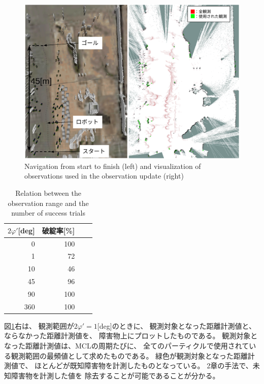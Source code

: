 \documentclass{jarticle}
\begin{document}
\begin{figure}[t]
  \centering
   \includegraphics[width=0.8\linewidth]{fig/particle_1000_observation_1_mcl.png}
   \caption{Navigation from start to finish (left) and visualization of observations used in the observation update (right)}
   \label{fig:スタートからゴールまでナビゲーション}
\end{figure}

\begin{table}[htbp]
	\centering
	\caption{Relation between the observation range and the number of success trials}
  \label{table:破綻率}
	\begin{small}
  \begin{tabular}{|r|r|r|r|} \hline
	  $2\varphi'$[deg]  & \small{破綻率}[\%] \\ \hline \hline
  {0}         & 100 \\ \hline
  {1}         & 72 \\ \hline
  {10}        & 46 \\ \hline
  {45}        & 96 \\ \hline
  {90}        & 100 \\ \hline
  {360}       & 100 \\ \hline
  \end{tabular}
	\end{small}
\end{table}

図\ref{fig:スタートからゴールまでナビゲーション}右は、
観測範囲が$2\varphi' = 1$[deg]のときに、
観測対象となった距離計測値と、
ならなかった距離計測値を、
障害物上にプロットしたものである。
観測対象となった距離計測値は、MCLの周期たびに、
全てのパーティクルで使用されている観測範囲の最頻値として求めたものである。
緑色が観測対象となった距離計測値で、
ほとんどが既知障害物を計測したものとなっている。
2章の手法で、未知障害物を計測した値を
除去することが可能であることが分かる。
\end{document}
